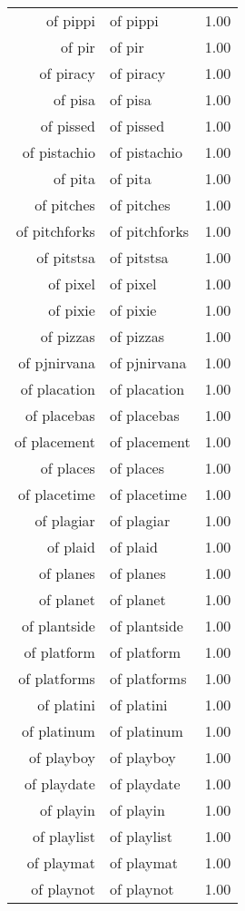 \begin{table}[ht]
\begin{tabular}{rlr}
  of pippi & of pippi & 1.00 \\ 
  of pir & of pir & 1.00 \\ 
  of piracy & of piracy & 1.00 \\ 
  of pisa & of pisa & 1.00 \\ 
  of pissed & of pissed & 1.00 \\ 
  of pistachio & of pistachio & 1.00 \\ 
  of pita & of pita & 1.00 \\ 
  of pitches & of pitches & 1.00 \\ 
  of pitchforks & of pitchforks & 1.00 \\ 
  of pitstsa & of pitstsa & 1.00 \\ 
  of pixel & of pixel & 1.00 \\ 
  of pixie & of pixie & 1.00 \\ 
  of pizzas & of pizzas & 1.00 \\ 
  of pjnirvana & of pjnirvana & 1.00 \\ 
  of placation & of placation & 1.00 \\ 
  of placebas & of placebas & 1.00 \\ 
  of placement & of placement & 1.00 \\ 
  of places & of places & 1.00 \\ 
  of placetime & of placetime & 1.00 \\ 
  of plagiar & of plagiar & 1.00 \\ 
  of plaid & of plaid & 1.00 \\ 
  of planes & of planes & 1.00 \\ 
  of planet & of planet & 1.00 \\ 
  of plantside & of plantside & 1.00 \\ 
  of platform & of platform & 1.00 \\ 
  of platforms & of platforms & 1.00 \\ 
  of platini & of platini & 1.00 \\ 
  of platinum & of platinum & 1.00 \\ 
  of playboy & of playboy & 1.00 \\ 
  of playdate & of playdate & 1.00 \\ 
  of playin & of playin & 1.00 \\ 
  of playlist & of playlist & 1.00 \\ 
  of playmat & of playmat & 1.00 \\ 
  of playnot & of playnot & 1.00 \\ 

\end{tabular}
\end{table}
